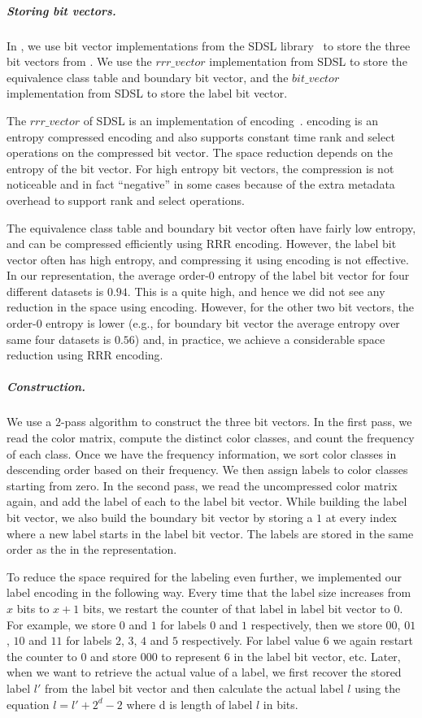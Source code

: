 \subparagraph{Storing bit vectors.} In \system, we use bit vector implementations
from the SDSL library~\cite{sdsl} to store the three bit vectors from
. We use the $rrr\_vector$ implementation from SDSL to store
the equivalence class table and boundary bit vector, and the $bit\_vector$ implementation
from SDSL to store the label bit vector.

The $rrr\_vector$ of SDSL is an implementation of \rrr encoding~\cite{RamanRaRa02}. \rrr
encoding is an entropy compressed encoding and also supports constant time rank
and select operations on the compressed bit vector.  The space reduction depends
on the entropy of the bit vector. For high entropy bit vectors, the compression
is not noticeable and in fact ``negative'' in some cases because of the extra
metadata overhead to support rank and select operations.

The equivalence class table and boundary bit vector often have fairly low
entropy, and can be compressed efficiently using RRR encoding. However, the
label bit vector often has high entropy, and compressing it using \rrr encoding
is not effective. In our representation, the average order-$0$ entropy of the
label bit vector for four different datasets is $0.94$. This is a quite high,
and hence we did not see any reduction in the space using \rrr encoding.
However, for the other two bit vectors, the order-$0$ entropy is lower (e.g.,
for boundary bit vector the average entropy over same four datasets is $0.56$)
and, in practice, we achieve a considerable space reduction using RRR encoding.

\subparagraph{Construction.} We use a $2$-pass algorithm to construct the three bit vectors. In the first pass, we read the color matrix, compute the distinct color classes, and count the frequency of each class. Once we have the frequency information, we sort color
classes in descending order based on their frequency. We then assign labels to
color classes starting from zero. In the second pass, we read the uncompressed
color matrix again, and add the label of each \kmer to the label bit vector.
While building the label bit vector, we also build the boundary bit vector by
storing a $1$ at every index where a new label starts in the label bit vector.
The labels are stored in the same order as the \kmers in the \boss
representation.

To reduce the space required for the labeling even further, we implemented our label
encoding in the following way. Every time that the label size increases from $x$
bits to $x+1$ bits, we restart the counter of that label in label bit vector to
$0$. For example, we store $0$ and $1$ for labels $0$ and $1$ respectively,
then we store $00$, $01$, $10$ and $11$ for labels $2$, $3$, $4$ and $5$
respectively. For label value $6$ we again restart the counter to $0$ and store
$000$ to represent $6$ in the label bit vector, etc. Later, when we want to retrieve
the actual value of a label, we first recover the stored label $l'$ from the label
bit vector and then calculate the actual label $l$ using the equation $l = l'
+ 2^{d}-2$ where d is length of label $l$ in bits.

